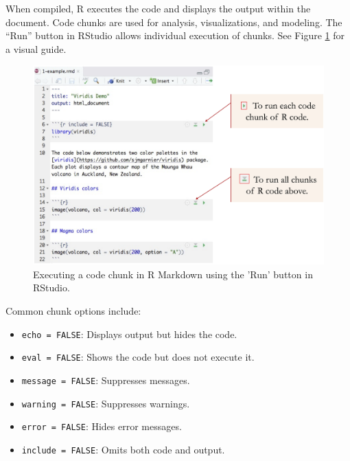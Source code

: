 \documentclass[
]{book}
\newcommand{\passthrough}[1]{#1}
\providecommand{\tightlist}{%
  \setlength{\itemsep}{0pt}\setlength{\parskip}{0pt}}
\theoremstyle{definition}
\theoremstyle{definition}
\theoremstyle{definition}
\theoremstyle{definition}
\theoremstyle{remark}
\begin{document}
When compiled, R executes the code and displays the output within the document. Code chunks are used for analysis, visualizations, and modeling. The ``Run'' button in RStudio allows individual execution of chunks. See Figure \ref{fig:run-chunk} for a visual guide.

\begin{figure}

{\centering \includegraphics[width=0.9\linewidth]{images/ch1_run-chunk} 

}

\caption{Executing a code chunk in R Markdown using the 'Run' button in RStudio.}\label{fig:run-chunk}
\end{figure}

Common chunk options include:

\begin{itemize}
\tightlist
\item
  \passthrough{\lstinline!echo = FALSE!}: Displays output but hides the code.\\
\item
  \passthrough{\lstinline!eval = FALSE!}: Shows the code but does not execute it.\\
\item
  \passthrough{\lstinline!message = FALSE!}: Suppresses messages.\\
\item
  \passthrough{\lstinline!warning = FALSE!}: Suppresses warnings.\\
\item
  \passthrough{\lstinline!error = FALSE!}: Hides error messages.\\
\item
  \passthrough{\lstinline!include = FALSE!}: Omits both code and output.
\end{itemize}
\end{document}
